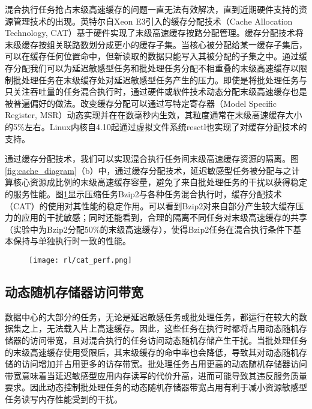 混合执行任务抢占末级高速缓存的问题一直无法有效解决，直到近期硬件支持的资源管理技术的出现。英特尔自Xeon E3引入的缓存分配技术（Cache Allocation Technology, CAT）基于硬件实现了末级高速缓存按路分配管理\cite{guide2011intel}。缓存分配技术将末级缓存按组关联路数划分成更小的缓存子集。当核心被分配给某一缓存子集后，可以在缓存任何位置命中，但新读取的数据只能写入其被分配的子集之中。通过缓存分配我们可以为延迟敏感型任务和批处理任务分配不相重叠的末级高速缓存以限制批处理任务在末级缓存处对延迟敏感型任务产生的压力。即使是将批处理任务与只关注吞吐量的任务混合执行时，通过硬件或软件技术动态分配末级高速缓存也是被普遍偏好的做法\cite{cook2013hardware}\cite{iyer2007qos}\cite{qureshi2006utility}\cite{lin2008gaining}\cite{nathuji2010q}。改变缓存分配可以通过写特定寄存器（Model Specific Register, MSR）动态实现并在在数毫秒内生效，其粒度通常在末级高速缓存大小的5\%左右\cite{herdrich2016cache}。Linux内核自4.10起通过虚拟文件系统resctl也实现了对缓存分配技术的支持。

通过缓存分配技术，我们可以实现混合执行任务间末级高速缓存资源的隔离。图\ref{fig:cache_diagram}（b）中，通过缓存分配技术，延迟敏感型任务被分配与之计算核心资源成比例的末级高速缓存容量，避免了来自批处理任务的干扰以获得稳定的服务性能。图\ref{fig:cat_perf}显示压缩任务Bzip2与各种任务混合执行时，缓存分配技术（CAT）的使用对其性能的稳定作用\cite{herdrich2016cache}。可以看到Bzip2对来自部分产生较大缓存压力的应用的干扰敏感；同时还能看到，合理的隔离不同任务对末级高速缓存的共享（实验中为Bzip2分配50\%的末级高速缓存），使得Bzip2任务在混合执行条件下基本保持与单独执行时一致的性能。

\begin{figure}
  \centering
    \centering
    \texttt{[image: rl/cat\_perf.png]}
    \label{fig:cat_perf}
\end{figure}

\subsection{动态随机存储器访问带宽}
数据中心的大部分的任务，无论是延迟敏感任务或批处理任务，都运行在较大的数据集之上，无法载入片上高速缓存。因此，这些任务在执行时都将占用动态随机存储器的访问带宽，且对混合执行的任务访问动态随机存储产生干扰。当批处理任务的末级高速缓存使用受限后，其末级缓存的命中率也会降低，导致其对动态随机存储的访问增加并占用更多的访存带宽。批处理任务占用更高的动态随机存储器访问带宽意味着当延迟敏感型应用内存读写的代价升高，进而可能导致其违反服务质量要求。因此动态控制批处理任务的动态随机存储器带宽占用有利于减小资源敏感型任务读写内存性能受到的干扰。

